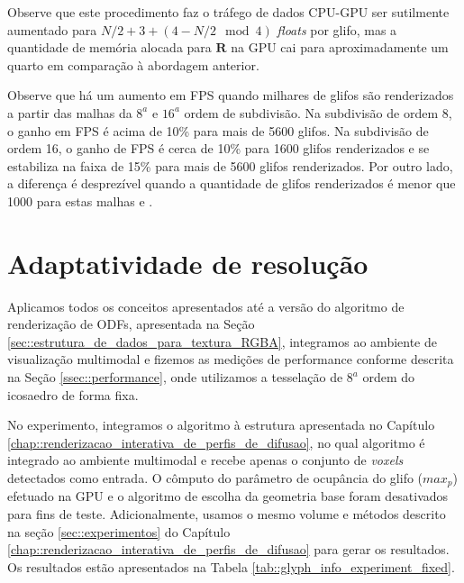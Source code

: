 \documentclass[
    12pt,                %
    oneside,            %
    a4paper,            %
    english,            %
    french,                %
    spanish,            %
    brazil                %
    ]{abntex2}
\begin{document}
Observe que este procedimento faz o tráfego de dados CPU-GPU ser sutilmente aumentado para $N/2 + 3 + (4 -N/2 \mod{4})$ \textit{floats} por glifo, mas a quantidade de memória alocada para $\mathbf{R}$ na GPU cai para aproximadamente um quarto em comparação à abordagem anterior.

Observe que há um aumento em FPS quando milhares de glifos são renderizados a partir das malhas da $8^a$ e $16^a$ ordem de subdivisão. Na subdivisão de ordem 8, o ganho em FPS é acima de 10\% para mais de 5600 glifos. Na subdivisão de ordem 16, o ganho de FPS é cerca de 10\% para 1600 glifos renderizados e se estabiliza na faixa de 15\% para mais de 5600 glifos renderizados. Por outro lado, a diferença é desprezível quando a quantidade de glifos renderizados é menor que 1000 para estas malhas e .




\section{Adaptatividade de resolução}
\label{sec::adaptatividade_de_resolucao}

Aplicamos todos os conceitos apresentados até a versão do algoritmo de renderização de ODFs, apresentada na Seção \ref{sec::estrutura_de_dados_para_textura_RGBA}, integramos ao ambiente de visualização multimodal e fizemos as medições de performance conforme descrita na Seção \ref{ssec::performance}, onde utilizamos a tesselação de $8^a$ ordem do icosaedro de forma fixa.

No experimento, integramos o algoritmo à estrutura apresentada no Capítulo \ref{chap::renderizacao_interativa_de_perfis_de_difusao}, no qual algoritmo é integrado ao ambiente multimodal e recebe apenas o conjunto de \textit{voxels} detectados como entrada. O cômputo do parâmetro de ocupância do glifo ($max_p$) efetuado na GPU e o algoritmo de escolha da geometria base foram desativados para fins de teste. Adicionalmente, usamos o mesmo volume e métodos descrito na seção \ref{sec::experimentos} do Capítulo \ref{chap::renderizacao_interativa_de_perfis_de_difusao} para gerar os resultados. Os resultados estão apresentados na Tabela \ref{tab::glyph_info_experiment_fixed}.
\end{document}
